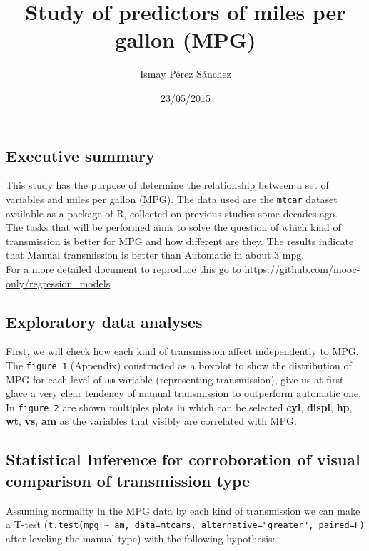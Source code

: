 \documentclass[]{article}
\title{Study of predictors of miles per gallon (MPG)}
\author{Ismay Pérez Sánchez}
\date{23/05/2015}
\begin{document}
\maketitle


\subsection{Executive summary}\label{executive-summary}

This study has the purpose of determine the relationship between a set
of variables and miles per gallon (MPG). The data used are the
\texttt{mtcar} dataset available as a package of R, collected on
previous studies some decades ago.\\The tasks that will be performed
aims to solve the question of which kind of transmission is better for
MPG and how different are they. The results indicate that Manual
transmission is better than Automatic in about 3 mpg.\\For a more
detailed document to reproduce this go to
\url{https://github.com/mooc-only/regression_models}

\subsection{Exploratory data analyses}\label{exploratory-data-analyses}

First, we will check how each kind of transmission affect independently
to MPG. The \texttt{figure 1} (Appendix) constructed as a boxplot to
show the distribution of MPG for each level of \texttt{am} variable
(representing transmission), give us at first glace a very clear
tendency of manual transmission to outperform automatic one. In
\texttt{figure 2} are shown multiples plots in which can be selected
\textbf{cyl}, \textbf{displ}, \textbf{hp}, \textbf{wt}, \textbf{vs},
\textbf{am} as the variables that visibly are correlated with MPG.

\subsection{Statistical Inference for corroboration of visual comparison
of transmission
type}\label{statistical-inference-for-corroboration-of-visual-comparison-of-transmission-type}

Assuming normality in the MPG data by each kind of transmission we can
make a T-test
(\texttt{t.test(mpg \textasciitilde{} am, data=mtcars, alternative="greater", paired=F)}
after leveling the manual type) with the following hypothesis:
\end{document}
